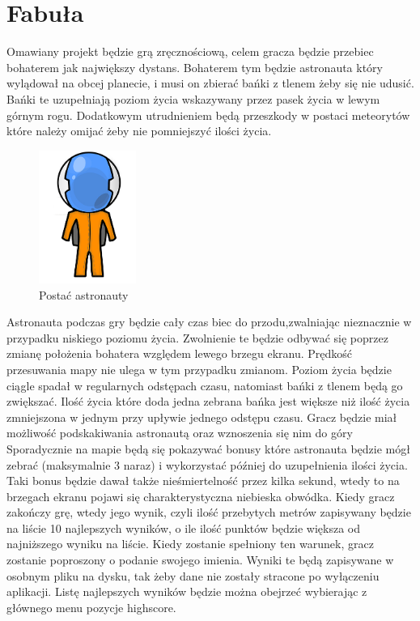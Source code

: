 \section{Fabuła}

\hspace{1cm} Omawiany projekt będzie grą zręcznościową, celem gracza będzie przebiec bohaterem jak największy dystans. Bohaterem tym będzie astronauta który wylądował na obcej planecie, i musi on zbierać bańki z tlenem żeby się nie udusić. Bańki te uzupełniają poziom życia wskazywany przez pasek życia w lewym górnym rogu. Dodatkowym utrudnieniem będą przeszkody w postaci meteorytów które należy omijać żeby nie pomniejszyć ilości życia.

 
\begin{figure}
\begin{center}
\includegraphics[width=120px]{./Pictures/astro.jpg}
\end{center}
\caption{Postać astronauty }
\label{Etykieta}
\end{figure}


Astronauta podczas gry będzie cały czas biec do przodu,zwalniając nieznacznie w przypadku niskiego poziomu życia. Zwolnienie te będzie odbywać się poprzez zmianę położenia bohatera względem lewego brzegu ekranu. Prędkość przesuwania mapy nie ulega w tym przypadku zmianom. Poziom życia będzie ciągle spadał w regularnych odstępach czasu, natomiast bańki z tlenem będą go zwiększać. Ilość życia które doda jedna zebrana bańka jest większe niż ilość życia zmniejszona w jednym przy upływie jednego odstępu czasu. Gracz będzie miał możliwość podskakiwania astronautą oraz wznoszenia się nim do góry Sporadycznie na mapie będą się pokazywać bonusy które astronauta będzie mógł zebrać (maksymalnie 3 naraz) i wykorzystać później do uzupełnienia ilości życia. Taki bonus 
będzie dawał także nieśmiertelność przez kilka sekund, wtedy to na brzegach ekranu pojawi się charakterystyczna niebieska obwódka. Kiedy gracz zakończy grę, wtedy jego wynik, czyli ilość przebytych metrów zapisywany będzie na liście 10 najlepszych wyników, o ile ilość punktów będzie większa od najniższego wyniku na liście. Kiedy zostanie spełniony ten warunek, gracz zostanie poproszony o podanie swojego imienia. Wyniki te będą zapisywane w osobnym pliku na dysku, tak żeby dane nie zostały stracone po wyłączeniu aplikacji. Listę najlepszych wyników będzie można obejrzeć wybierając z głównego menu pozycje highscore. 

